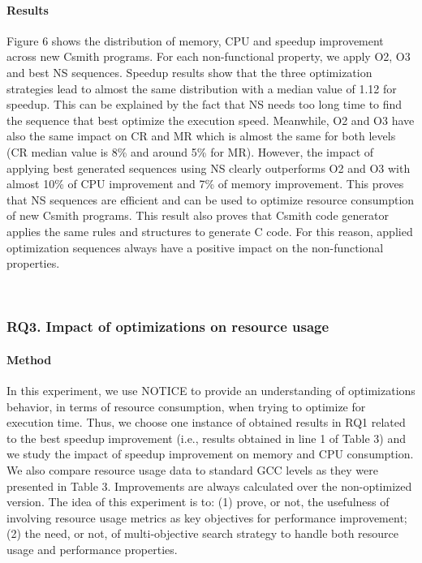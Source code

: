 \paragraph{Results}
Figure 6 shows the distribution of memory, CPU and speedup improvement across new Csmith programs. For each non-functional property, we apply O2, O3 and best NS sequences. Speedup results show that the three optimization strategies lead to almost the same distribution with a median value of 1.12 for speedup. This can be explained by the fact that NS needs too long time to find the sequence that best optimize the execution speed. Meanwhile, O2 and O3 have also the same impact on CR and MR which is almost the same for both levels (CR median value is 8\% and around 5\% for MR).
However, the impact of applying best generated sequences using NS clearly outperforms O2 and O3 with almost 10\% of CPU improvement and 7\% of memory improvement. This proves that NS sequences are efficient and can be used to optimize resource consumption of new Csmith programs. This result also proves that Csmith code generator applies the same rules and structures to generate C code. For this reason, applied optimization sequences always have a positive impact on the non-functional properties.


\noindent{}\\
\subsubsection{RQ3. Impact of optimizations on resource usage}
\paragraph{Method}
In this experiment, we use NOTICE to provide an understanding of optimizations behavior, in terms of resource consumption, when trying to optimize for execution time. Thus, we choose one instance of obtained results in RQ1 related to the best speedup improvement (i.e., results obtained in line 1 of Table 3) and we study the impact of speedup improvement on memory and CPU consumption. We also compare resource usage data to standard GCC levels as they were presented in Table 3. Improvements are always calculated over the non-optimized version. The idea of this experiment is to: (1) prove, or not, the usefulness of involving resource usage metrics as key objectives for performance improvement; (2) the need, or not, of multi-objective search strategy to handle both resource usage and performance properties.

